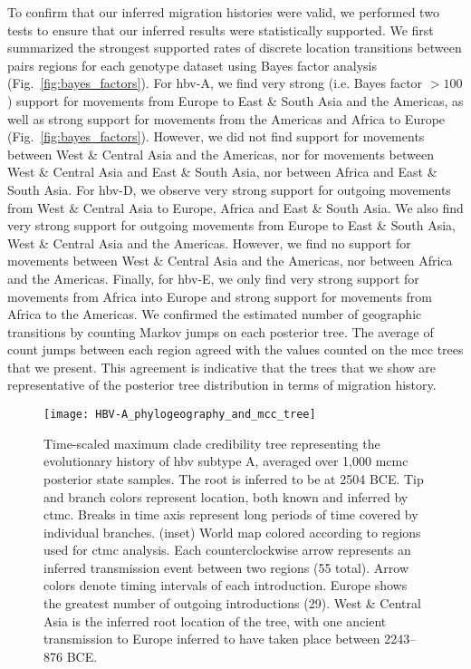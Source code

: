 To confirm that our inferred migration histories were valid, we performed two tests to ensure that our inferred results were statistically supported.
We first summarized the strongest supported rates of discrete location transitions between pairs regions for each genotype dataset using Bayes factor analysis (Fig.~\ref{fig:bayes_factors}).
For \gls{hbv}-A, we find very strong (i.e. Bayes factor $>100$) support for movements from Europe to East \& South Asia and the Americas, as well as strong support for movements from the Americas and Africa to Europe (Fig.~\ref{fig:bayes_factors}).
However, we did not find support for movements between West \& Central Asia and the Americas, nor for movements between West \& Central Asia and East \& South Asia, nor between Africa and East \& South Asia.
For \gls{hbv}-D, we observe very strong support for outgoing movements from West \& Central Asia to Europe, Africa and East \& South Asia.
We also find very strong support for outgoing movements from Europe to East \& South Asia, West \& Central Asia and the Americas.
However, we find no support for movements between West \& Central Asia and the Americas, nor between Africa and the Americas.
Finally, for \gls{hbv}-E, we only find very strong support for movements from Africa into Europe and strong support for movements from Africa to the Americas.
We confirmed the estimated number of geographic transitions by counting Markov jumps on each posterior tree.
The average of count jumps between each region agreed with the values counted on the \gls{mcc} trees that we present.
This agreement is indicative that the trees that we show are representative of the posterior tree distribution in terms of migration history.

\begin{figure}[ht]
  \centering
  \medskip
  \texttt{[image: HBV-A\_phylogeography\_and\_mcc\_tree]}
  \caption[HBV-A phylogeography ]{Time-scaled maximum clade credibility tree representing the evolutionary history of \gls{hbv} subtype A, averaged over 1,000 \gls{mcmc} posterior state samples. The root is inferred to be at 2504 BCE. Tip and branch colors represent location, both known and inferred by \gls{ctmc}. Breaks in time axis represent long periods of time covered by individual branches. (inset) World map colored according to regions used for \gls{ctmc} analysis. Each counterclockwise arrow represents an inferred transmission event between two regions (55 total). Arrow colors denote timing intervals of each introduction. Europe shows the greatest number of outgoing introductions (29). West \& Central Asia is the inferred root location of the tree, with one ancient transmission to Europe inferred to have taken place between 2243--876 BCE.}
  \label{fig:HBV-A_phylogeo}
\end{figure}

